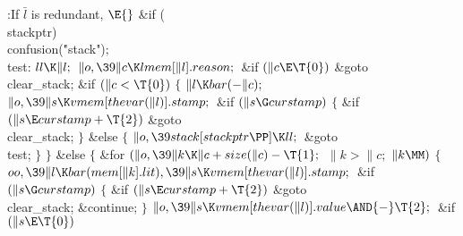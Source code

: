 \Y\B\4:If $\bar l$ is redundant, \X${}\E{}$\6
\&{if} (\\{stackptr})\1\5
\\{confusion}(\.{"stack"});\2\6
\4\\{test}:\5
${}\\{ll}\K\|l;{}$\6
${}\|o,\39\|c\K\\{lmem}[\|l].\\{reason};{}$\6
\&{if} ${}(\|c\E\T{0}){}$\1\5
\&{goto} \\{clear\_stack};\2\6
\&{if} ${}(\|c<\T{0}){}$\5
${}\{{}$\1\6
${}\|l\K\\{bar}({-}\|c);{}$\6
${}\|o,\39\|s\K\\{vmem}[\\{thevar}(\|l)].\\{stamp};{}$\6
\&{if} ${}(\|s\G\\{curstamp}){}$\5
${}\{{}$\1\6
\&{if} ${}(\|s\E\\{curstamp}+\T{2}){}$\1\5
\&{goto} \\{clear\_stack};\2\6
\4${}\}{}$\5
\2\&{else}\5
${}\{{}$\1\6
${}\|o,\39\\{stack}[\\{stackptr}\PP]\K\\{ll};{}$\6
\&{goto} \\{test};\6
\4${}\}{}$\2\6
\4${}\}{}$\5
\2\&{else}\5
${}\{{}$\1\6
\&{for} ${}(\|o,\39\|k\K\|c+\\{size}(\|c)-\T{1};{}$ ${}\|k>\|c;{}$ ${}\|k%
\MM){}$\5
${}\{{}$\1\6
${}\\{oo},\39\|l\K\\{bar}(\\{mem}[\|k].\\{lit}),\39\|s\K\\{vmem}[\\{thevar}(%
\|l)].\\{stamp};{}$\6
\&{if} ${}(\|s\G\\{curstamp}){}$\5
${}\{{}$\1\6
\&{if} ${}(\|s\E\\{curstamp}+\T{2}){}$\1\5
\&{goto} \\{clear\_stack};\2\6
\&{continue};\6
\4${}\}{}$\2\6
${}\|o,\39\|s\K\\{vmem}[\\{thevar}(\|l)].\\{value}\AND{-}\T{2};{}$\6
\&{if} ${}(\|s\E\T{0}){}$\1\5
